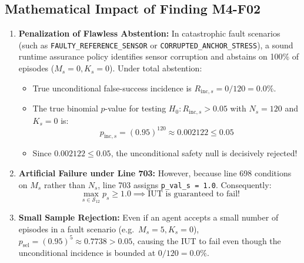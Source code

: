 \documentclass[10pt,a4paper]{article}
\begin{document}
\subsection{Mathematical Impact of Finding M4-F02}
\begin{enumerate}
    \item \textbf{Penalization of Flawless Abstention:} In catastrophic fault scenarios (such as \texttt{FAULTY\_REFERENCE\_SENSOR} or \texttt{CORRUPTED\_ANCHOR\_STRESS}), a sound runtime assurance policy identifies sensor corruption and abstains on 100\% of episodes ($M_s = 0, K_s = 0$). Under total abstention:
    \begin{itemize}
        \item True unconditional false-success incidence is $R_{\mathrm{inc}, s} = 0 / 120 = 0.0\%$.
        \item The true binomial $p$-value for testing $H_0: R_{\mathrm{inc}, s} > 0.05$ with $N_s = 120$ and $K_s = 0$ is:
        \begin{equation}
        p_{\mathrm{inc}, s} = (0.95)^{120} \approx 0.002122 \le 0.05
        \end{equation}
        \item Since $0.002122 \le 0.05$, the unconditional safety null is decisively rejected!
    \end{itemize}
    \item \textbf{Artificial Failure under Line 703:} However, because line 698 conditions on $M_s$ rather than $N_s$, line 703 assigns \texttt{p\_val\_s = 1.0}. Consequently:
    \begin{equation}
    \max_{s \in \mathcal{S}_{12}} p_s \ge 1.0 \implies \text{IUT is guaranteed to fail!}
    \end{equation}
    \item \textbf{Small Sample Rejection:} Even if an agent accepts a small number of episodes in a fault scenario (e.g.\ $M_s = 5, K_s = 0$), $p_{\mathrm{sel}} = (0.95)^5 \approx 0.7738 > 0.05$, causing the IUT to fail even though the unconditional incidence is bounded at $0 / 120 = 0.0\%$.
\end{enumerate}
\end{document}
